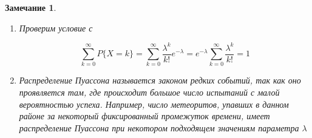 \documentclass[a4paper, 14pt]{report}
\newtheorem{note}{Замечание}[chapter]
\begin{document}
\begin{note}
    \begin{enumerate}
        \item Проверим условие с 

            $$
            \sum_{k=0}^{\infty} P\{X = k\} = \sum_{k=0}^\infty \frac{\lambda^k}{k!} e^{-\lambda} = e^{-\lambda} \sum_{k=0}^\infty \frac{\lambda^k}{k!} = 1
            $$

        \item Распределение Пуассона называется законом редких событий, так как оно проявляется там, где происходит большое число испытаний с малой вероятностью успеха. Например, число метеоритов, упавших в данном районе за некоторый фиксированный промежуток времени, имеет распределение Пуассона при некотором подходящем значениям параметра $\lambda$
    \end{enumerate}
\end{note}
\end{document}
